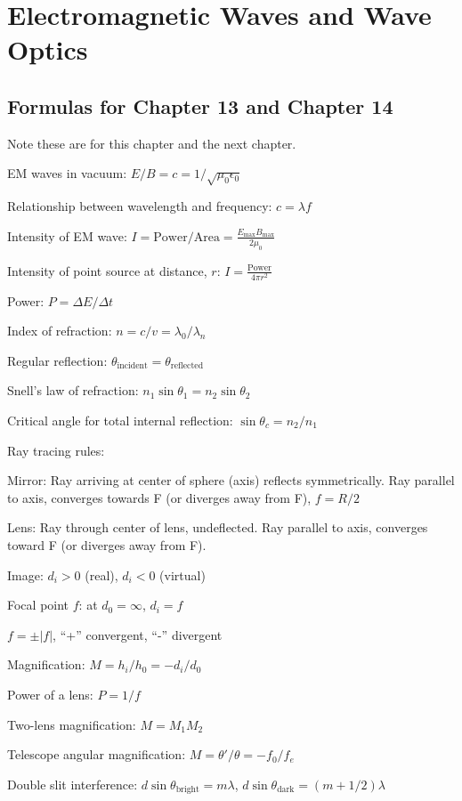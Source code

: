 \documentclass[../physics12.tex]{subfiles}
\begin{document}
\chapter{Electromagnetic Waves and Wave Optics}
\section{Formulas for Chapter 13 and Chapter 14}
Note these are for this chapter and the next chapter.

EM waves in vacuum: $E/B = c = 1/\sqrt{\mu_0 \epsilon_0}$

Relationship between wavelength and frequency: $c=\lambda f$

Intensity of EM wave: $I = \text{Power}/\text{Area} = \frac{E_{\text{max}}B_\text{max}}{2\mu_0}$

Intensity of point source at distance, $r$: $I = \frac{\text{Power}}{4\pi r^2}$

Power: $P = \Delta E/\Delta t$

Index of refraction: $n=c/v=\lambda_0/\lambda_n$

Regular reflection: $\theta_{\text{incident}}=\theta_{\text{reflected}}$

Snell's law of refraction: $n_1\sin\theta_1 = n_2\sin\theta_2$

Critical angle for total internal reflection: $\sin\theta_c = n_2/n_1$

Ray tracing rules:

Mirror: Ray arriving at center of sphere (axis) reflects symmetrically. Ray parallel to axis, converges towards F (or diverges away from F), $f=R/2$

Lens: Ray through center of lens, undeflected. Ray parallel to axis, converges toward F (or diverges away from F).

Image: $d_i>0$ (real), $d_i<0$ (virtual)

Focal point $f$: at $d_0=\infty$, $d_i=f$ 
\begin{center}
    $f = \pm |f|$, ``+'' convergent, ``-'' divergent 
\end{center}

Magnification: $M=h_i/h_0 = -d_i/d_0$

Power of a lens: $P=1/f$

Two-lens magnification: $M=M_1M_2$

Telescope angular magnification: $M=\theta'/\theta = -f_0/f_e$

Double slit interference: $d\sin\theta_{\text{bright}} = m\lambda$, $d\sin\theta_{\text{dark}} = (m+1/2)\lambda$
\end{document}
